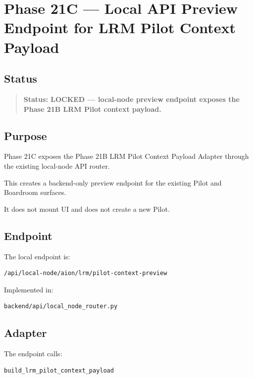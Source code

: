 \section{Phase 21C --- Local API Preview Endpoint for LRM Pilot Context Payload}
\label{sec:phase21c-lrm-pilot-context-preview-api-lock}

\subsection{Status}

\begin{quote}
\textbf{Status: LOCKED --- local-node preview endpoint exposes the Phase 21B LRM Pilot context payload.}
\end{quote}

\subsection{Purpose}

Phase 21C exposes the Phase 21B LRM Pilot Context Payload Adapter through the existing local-node API router.

This creates a backend-only preview endpoint for the existing Pilot and Boardroom surfaces.

It does not mount UI and does not create a new Pilot.

\subsection{Endpoint}

The local endpoint is:

\begin{verbatim}
/api/local-node/aion/lrm/pilot-context-preview
\end{verbatim}

Implemented in:

\begin{verbatim}
backend/api/local_node_router.py
\end{verbatim}

\subsection{Adapter}

The endpoint calls:

\begin{verbatim}
build_lrm_pilot_context_payload
\end{verbatim}

